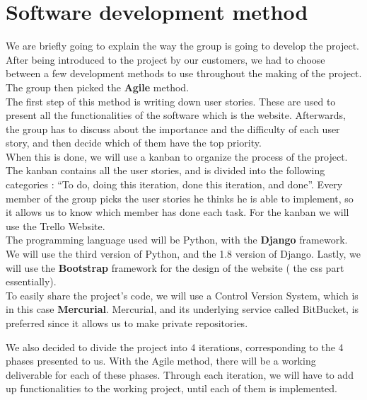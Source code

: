 \documentclass[a4paper, 12pt]{article}
\begin{document}
\section{Software development method}

We are briefly going to explain the way the group is going to develop the project. After being introduced to the project by our customers, we had to choose between a few development methods to use throughout the making of the project. The group then picked the \textbf{Agile} method. \\

The first step of this method is writing down user stories. These are used to present all the functionalities of the software which is the website. Afterwards, the group has to discuss about the importance and the difficulty of each user story, and then decide which of them have the top priority. \\

When this is done, we will use a kanban to organize the process of the project. The kanban contains all the user stories, and is divided into the following categories : “To do, doing this iteration, done this iteration, and done”. Every member of the group picks the user stories he thinks he is able to implement, so it allows us to know which member has done each task. For the kanban we will use the Trello Website. \\

The programming language used will be Python, with the \textbf{Django} framework. We will use the third version of Python, and the 1.8 version of Django. Lastly, we will use the \textbf{Bootstrap} framework for the design of the website ( the css part essentially). \\

To easily share the project’s code, we will use a Control Version System, which is in this case \textbf{Mercurial}. Mercurial, and its underlying service called BitBucket, is preferred since it allows us to make private repositories. 

We also decided to divide the project into 4 iterations, corresponding to the 4 phases presented to us. With the Agile method, there will be a working deliverable for each of these phases. Through each iteration, we will have to add up functionalities to the working project, until each of them is implemented.  \\
\end{document}
